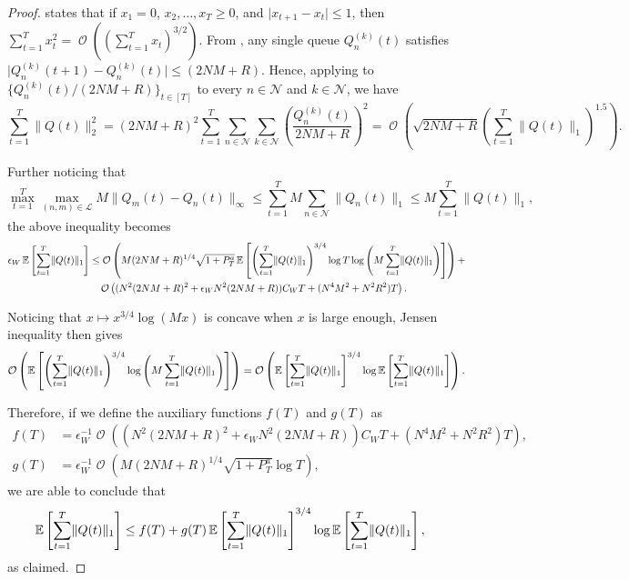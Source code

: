 \documentclass[11pt,fullpage,letterpaper]{article} %
\renewcommand{\bm}[1]{#1}%
\renewcommand{\O}{\operatorname{\mathcal O}}
\newcommand{\E}{\operatornamewithlimits{\mathbb{E}}}
\newcommand{\mN}{{\mathcal N}}
\newcommand{\mL}{{\mathcal L}}
\begin{document}
\begin{proof}
 states that if $x_1=0$, $x_2,\ldots,x_T \ge 0$, and $\lvert x_{t+1}-x_t\rvert\le 1$, then $\sum_{t=1}^T x_t^2 = \O\left ((\sum_{t=1}^T x_t)^{3/2}\right )$. From , any single queue $Q_n^{(k)}(t)$ satisfies $\lvert Q_n^{(k)}(t+1)-Q_n^{(k)}(t)\rvert \le (2NM + R)$.
Hence, applying  to $\{Q_n^{(k)}(t) / (2NM+R)\}_{t\in [T]}$ to every $n\in \mN$ and $k\in \mN$, we have
\begin{equation*}
\sum_{t=1}^T \lVert \bm Q(t)\rVert_2^2 = (2NM+R)^2 \sum_{t=1}^T \sum_{n\in \mN} \sum_{k\in \mN} \left (\frac{Q_n^{(k)}(t)}{2NM+R}\right )^2 =\O\left (\sqrt{2NM+R} \left (\sum_{t=1}^T \lVert \bm Q(t)\rVert_1\right )^{1.5}\right ).
\end{equation*}

Further noticing that
\begin{equation*}
\max_{t=1}^T \max_{(n,m)\in \mL} M \lVert \bm Q_m(t) - \bm Q_n(t)\rVert_\infty\le \sum_{t=1}^T M \sum_{n\in \mN} \lVert \bm Q_n(t)\rVert_1\le M \sum_{t=1}^T \lVert \bm Q(t)\rVert_1,
\end{equation*}
the above inequality becomes
\begin{align*}
\epsilon_W \E\left [\sum_{t=1}^T \lVert \bm Q(t)\rVert_1\right ]&\le \O\left (M (2NM+R)^{1/4} \sqrt{1+P_T^a} \E\left [\left (\sum_{t=1}^T \lVert \bm Q(t)\rVert_1\right )^{3/4} \log T \log \left (M \sum_{t=1}^T \lVert \bm Q(t)\rVert_1\right )\right ]\right )+\\
&\quad \O\left ((N^2(2NM+R)^2 + \epsilon_W N^2 (2NM+R))C_W T + (N^4 M^2 + N^2 R^2)T\right ).
\end{align*}

Noticing that $x\mapsto x^{3/4} \log (M x)$ is concave when $x$ is large enough, Jensen inequality then gives
\begin{equation*}
\O\left (\E\left [\left (\sum_{t=1}^T \lVert \bm Q(t)\rVert_1\right )^{3/4} \log \left (M \sum_{t=1}^T \lVert \bm Q(t)\rVert_1\right ) \right ]\right )= \O\left (\E\left [\sum_{t=1}^T \lVert \bm Q(t)\rVert_1\right ]^{3/4} \log \E \left [ \sum_{t=1}^T \lVert \bm Q(t)\rVert_1\right ]\right ).
\end{equation*}

Therefore, if we define the auxiliary functions $f(T)$ and $g(T)$ as
\begin{align*}
f(T)&=\epsilon_W^{-1}\O\left ((N^2(2NM+R)^2 + \epsilon_W N^2 (2NM+R))C_W T + (N^4 M^2 + N^2 R^2)T\right ),\\
g(T)&=\epsilon_W^{-1} \O\left (M (2NM+R)^{1/4} \sqrt{1+P_T^a} \log T\right ),
\end{align*}
we are able to conclude that
\begin{align*}
\E\left [\sum_{t=1}^T \lVert \bm Q(t)\rVert_1\right ]&\le f(T) + g(T) \E\left [\sum_{t=1}^T \lVert \bm Q(t)\rVert_1\right ]^{3/4} \log \E \left [ \sum_{t=1}^T \lVert \bm Q(t)\rVert_1\right ],
\end{align*}
as claimed.
\end{proof}
\end{document}
